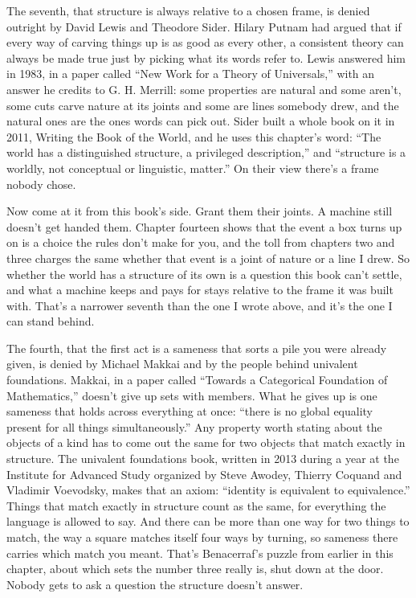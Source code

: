 \documentclass[11pt,twoside]{article}
\theoremstyle{thielethm}
\theoremstyle{thieledef}
\theoremstyle{thieledef}
\theoremstyle{thieledef}
\theoremstyle{thielethm}
\theoremstyle{thieleobs}
\theoremstyle{thielethm}
\begin{document}
The seventh, that structure is always relative to a chosen frame, is denied outright by David Lewis and Theodore Sider. Hilary Putnam had argued that if every way of carving things up is as good as every other, a consistent theory can always be made true just by picking what its words refer to. Lewis answered him in 1983, in a paper called ``New Work for a Theory of Universals,'' with an answer he credits to G. H. Merrill: some properties are natural and some aren't, some cuts carve nature at its joints and some are lines somebody drew, and the natural ones are the ones words can pick out. Sider built a whole book on it in 2011, Writing the Book of the World, and he uses this chapter's word: ``The world has a distinguished structure, a privileged description,'' and ``structure is a worldly, not conceptual or linguistic, matter.'' On their view there's a frame nobody chose.

Now come at it from this book's side. Grant them their joints. A machine still doesn't get handed them. Chapter fourteen shows that the event a box turns up on is a choice the rules don't make for you, and the toll from chapters two and three charges the same whether that event is a joint of nature or a line I drew. So whether the world has a structure of its own is a question this book can't settle, and what a machine keeps and pays for stays relative to the frame it was built with. That's a narrower seventh than the one I wrote above, and it's the one I can stand behind.

The fourth, that the first act is a sameness that sorts a pile you were already given, is denied by Michael Makkai and by the people behind univalent foundations. Makkai, in a paper called ``Towards a Categorical Foundation of Mathematics,'' doesn't give up sets with members. What he gives up is one sameness that holds across everything at once: ``there is no global equality present for all things simultaneously.'' Any property worth stating about the objects of a kind has to come out the same for two objects that match exactly in structure. The univalent foundations book, written in 2013 during a year at the Institute for Advanced Study organized by Steve Awodey, Thierry Coquand and Vladimir Voevodsky, makes that an axiom: ``identity is equivalent to equivalence.'' Things that match exactly in structure count as the same, for everything the language is allowed to say. And there can be more than one way for two things to match, the way a square matches itself four ways by turning, so sameness there carries which match you meant. That's Benacerraf's puzzle from earlier in this chapter, about which sets the number three really is, shut down at the door. Nobody gets to ask a question the structure doesn't answer.
\end{document}
